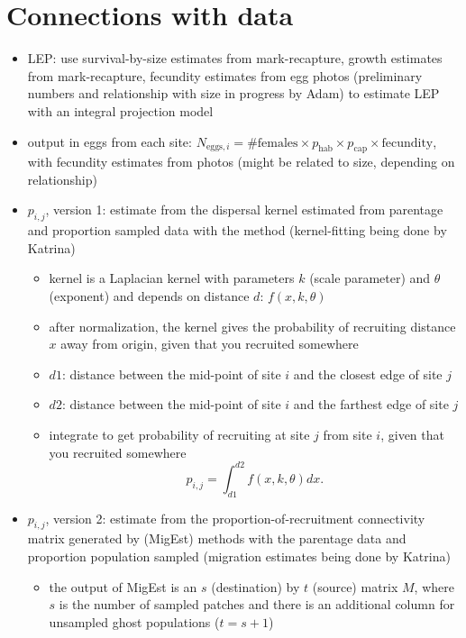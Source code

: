 \documentclass[12pt, oneside]{article}   	%
\begin{document}
\section{Connections with data}
\begin{itemize}
	\item LEP: use survival-by-size estimates from mark-recapture, growth estimates from mark-recapture, fecundity estimates from egg photos (preliminary numbers and relationship with size in progress by Adam) to estimate LEP with an integral projection model
	\item output in eggs from each site:
	$N_{\text{eggs}, i} = \# \text{females} \times p_{\text{hab}} \times p_{\text{cap}} \times \text{fecundity}$, with fecundity estimates from photos (might be related to size, depending on relationship)
	\item $p_{i,j}$, version 1: estimate from the dispersal kernel estimated from parentage and proportion sampled data with the \cite{bode2018estimating} method (kernel-fitting being done by Katrina)
		\begin{itemize}
			\item kernel is a Laplacian kernel with parameters $k$ (scale parameter) and $\theta$ (exponent) and depends on distance $d$: $f(x,k,\theta)$
			\item after normalization, the kernel gives the probability of recruiting distance $x$ away from origin, given that you recruited somewhere
			\item $d1$: distance between the mid-point of site $i$ and the closest edge of site $j$ 
			\item $d2$: distance between the mid-point of site $i$ and the farthest edge of site $j$
			\item integrate to get probability of recruiting at site $j$ from site $i$, given that you recruited somewhere
			\begin{equation}
			p_{i,j} = \int_{d1}^{d2}{f(x,k,\theta) dx}. \label{PijfromKernel}
			\end{equation}
		\end{itemize}
	\item $p_{i,j}$, version 2: estimate from the proportion-of-recruitment connectivity matrix generated by \cite{wang2014estimation} (MigEst) methods with the parentage data and proportion population sampled (migration estimates being done by Katrina)
		\begin{itemize}
			\item the output of MigEst is an $s$ (destination) by $t$ (source) matrix $M$, where $s$ is the number of sampled patches and there is an additional column for unsampled ghost populations ($t = s+1$)

\end{itemize}
\end{itemize}
\end{document}

